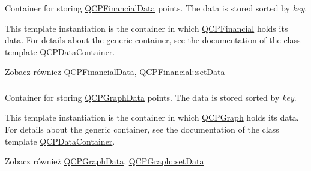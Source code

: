 \subsubsection[{\texorpdfstring{Q\+C\+P\+Financial\+Data\+Container}{QCPFinancialDataContainer}}]{}\hypertarget{qcustomplot_8hh_ae36e482e04f19a54782f01ab38c354a6}{}\label{qcustomplot_8hh_ae36e482e04f19a54782f01ab38c354a6}
Container for storing \hyperlink{class_q_c_p_financial_data}{Q\+C\+P\+Financial\+Data} points. The data is stored sorted by {\itshape key}.

This template instantiation is the container in which \hyperlink{class_q_c_p_financial}{Q\+C\+P\+Financial} holds its data. For details about the generic container, see the documentation of the class template \hyperlink{class_q_c_p_data_container}{Q\+C\+P\+Data\+Container}.

\begin{DoxySeeAlso}{Zobacz również}
\hyperlink{class_q_c_p_financial_data}{Q\+C\+P\+Financial\+Data}, \hyperlink{class_q_c_p_financial_a72089e75b8a50d18097526c3c79fdb85}{Q\+C\+P\+Financial\+::set\+Data} 
\end{DoxySeeAlso}
\subsubsection[{\texorpdfstring{Q\+C\+P\+Graph\+Data\+Container}{QCPGraphDataContainer}}]{}\hypertarget{qcustomplot_8hh_a2e5583d1ae212f0deb10537cf975a15a}{}\label{qcustomplot_8hh_a2e5583d1ae212f0deb10537cf975a15a}
Container for storing \hyperlink{class_q_c_p_graph_data}{Q\+C\+P\+Graph\+Data} points. The data is stored sorted by {\itshape key}.

This template instantiation is the container in which \hyperlink{class_q_c_p_graph}{Q\+C\+P\+Graph} holds its data. For details about the generic container, see the documentation of the class template \hyperlink{class_q_c_p_data_container}{Q\+C\+P\+Data\+Container}.

\begin{DoxySeeAlso}{Zobacz również}
\hyperlink{class_q_c_p_graph_data}{Q\+C\+P\+Graph\+Data}, \hyperlink{class_q_c_p_graph_a1eae9429a316b008e2d99b2d65a54395}{Q\+C\+P\+Graph\+::set\+Data} 
\end{DoxySeeAlso}
